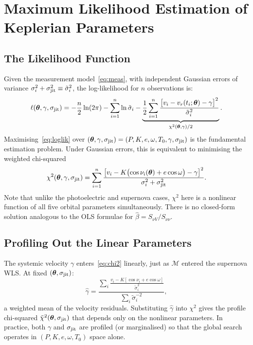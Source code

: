 \documentclass[12pt]{article}
\begin{document}
\section{Maximum Likelihood Estimation of Keplerian Parameters}
\label{sec:mle}

\subsection{The Likelihood Function}

Given the measurement model~\eqref{eq:meas}, with independent Gaussian
errors of variance $\sigma_i^2 + \sigma_{\rm jit}^2 \equiv \tilde\sigma_i^2$,
the log-likelihood for $n$ observations is:
\begin{equation}\label{eq:loglik}
  \ell(\boldsymbol\theta, \gamma, \sigma_{\rm jit}) =
  -\frac{n}{2}\ln(2\pi)
  - \sum_{i=1}^n\ln\tilde\sigma_i
  - \underbrace{\frac{1}{2}\sum_{i=1}^n
    \frac{\bigl[v_i - v_r(t_i;\boldsymbol\theta) - \gamma\bigr]^2}
    {\tilde\sigma_i^2}}_{\chi^2(\boldsymbol\theta,\gamma)/2}.
\end{equation}
Maximising~\eqref{eq:loglik} over
$(\boldsymbol\theta, \gamma, \sigma_{\rm jit}) = (P, K, e, \omega,
T_0, \gamma, \sigma_{\rm jit})$ is the fundamental estimation problem.
Under Gaussian errors, this is equivalent to minimising the weighted
chi-squared
\begin{equation}\label{eq:chi2}
  \chi^2(\boldsymbol\theta,\gamma,\sigma_{\rm jit}) =
  \sum_{i=1}^n
  \frac{\bigl[v_i - K\bigl(\cos\nu_i(\boldsymbol\theta) + e\cos\omega\bigr)
    - \gamma\bigr]^2}
  {\sigma_i^2 + \sigma_{\rm jit}^2}.
\end{equation}
Note that unlike the photoelectric and supernova cases, $\chi^2$ here is
a nonlinear function of all five orbital parameters simultaneously.
There is no closed-form solution analogous to the OLS formulae for
$\hat\beta = S_{\nu V}/S_{\nu\nu}$.

\subsection{Profiling Out the Linear Parameters}

The systemic velocity $\gamma$ enters~\eqref{eq:chi2} linearly, just as
$\mathcal{M}$ entered the supernova WLS.  At fixed
$(\boldsymbol\theta, \sigma_{\rm jit})$:
\begin{equation}\label{eq:gamma_hat}
  \hat\gamma = \frac{\displaystyle\sum_i
    \frac{v_i - K[\cos\nu_i + e\cos\omega]}{\tilde\sigma_i^2}}
  {\displaystyle\sum_i \tilde\sigma_i^{-2}},
\end{equation}
a weighted mean of the velocity residuals.  Substituting
$\hat\gamma$ into $\chi^2$ gives the profile chi-squared
$\tilde\chi^2(\boldsymbol\theta, \sigma_{\rm jit})$ that depends
only on the nonlinear parameters.  In practice, both $\gamma$ and
$\sigma_{\rm jit}$ are profiled (or marginalised) so that the global
search operates in $(P, K, e, \omega, T_0)$ space alone.
\end{document}

